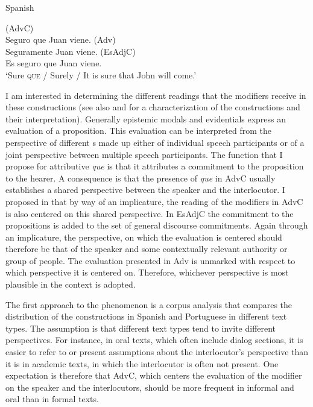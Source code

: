 \ea\label{ex:epevsp} 	Spanish\\
	\ea
		
			(AdvC) \\
	 Seguro que Juan viene. 		
	 \ex (Adv)  \\
				Seguramente Juan viene. 
		\ex 	 (EsAdjC)\\
		Es seguro que Juan viene.  \\
		`Sure \textsc{que} / Surely / It is sure that John will come.'
	\z
\z

I am interested in determining the different readings that the modifiers receive  in these constructions (see also  and  for a characterization of the constructions and their interpretation). Generally epistemic modals and evidentials express an evaluation of a proposition. This evaluation can be interpreted from the perspective of different s made up either of  individual speech participants or of a joint perspective between multiple speech participants. The function that I propose for attributive \emph{que} is that it attributes a commitment to the proposition  to the hearer. A consequence is that the presence of  \emph{que} in AdvC usually establishes a shared perspective between the speaker and the interlocutor. I  proposed in  that by way of an implicature,  the  reading of the modifiers in AdvC is also centered on this shared perspective. In EsAdjC  the commitment to the propositions is added to the set of general discourse commitments. Again through an implicature, the perspective, on which   the evaluation is centered should therefore be that of the speaker and some contextually relevant authority or group of people. The evaluation presented in Adv is unmarked with respect to which perspective it is centered on. Therefore, whichever perspective is most plausible in the context is adopted. 

The first approach to the phenomenon is a corpus analysis that compares the distribution of the constructions in Spanish and Portuguese in different text types. The assumption is that different text types tend to invite different perspectives. For instance, in oral texts, which often include dialog sections, it is easier to refer to or present assumptions about the interlocutor's perspective than it is in academic texts, in which the interlocutor is often not present. One expectation is therefore that AdvC, which centers the evaluation of the modifier on the speaker and the interlocutors, should be more frequent in informal and oral than in formal texts. 



